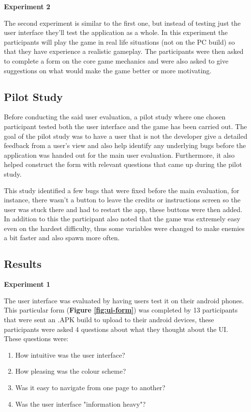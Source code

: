 \documentclass{dissertation}
\begin{document}
\textbf{Experiment 2}

The second experiment is similar to the first one, but instead of testing just the user interface they'll test the application as a whole. In this experiment the participants will play the game in real life situations (not on the PC build) so that they have experience a realistic gameplay. The participants were then asked to complete a form on the core game mechanics and were also asked to give suggestions on what would make the game better or more motivating.

\subsection{Pilot Study}
Before conducting the said user evaluation, a pilot study where one chosen participant tested both the user interface and the game has been carried out. The goal of the pilot study was to have a user that is not the developer give a detailed feedback from a user's view and also help identify any underlying bugs before the application was handed out for the main user evaluation. Furthermore, it also helped construct the form with relevant questions that came up during the pilot study.

This study identified a few bugs that were fixed before the main evaluation, for instance, there wasn't a button to leave the credits or instructions screen so the user was stuck there and had to restart the app, these buttons were then added. In addition to this the participant also noted that the game was extremely easy even on the hardest difficulty, thus some variables were changed to make enemies a bit faster and also spawn more often.

\subsection{Results}
\textbf{Experiment 1}

The user interface was evaluated by having users test it on their android phones. This particular form (\textbf{Figure \ref{fig:ui-form}}) was completed by 13 participants that were sent an .APK build to upload to their android devices, these participants were asked 4 questions about what they thought about the UI. These questions were: 

\begin{enumerate}
\item How intuitive was the user interface?
\item How pleasing was the colour scheme?
\item Was it easy to navigate from one page to another?
\item Was the user interface "information heavy"?
\end{enumerate}
\end{document}
